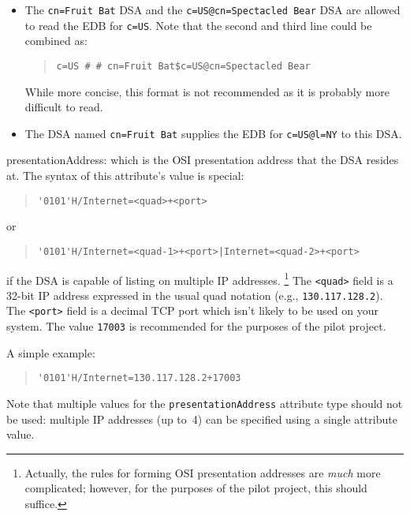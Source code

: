 \begin{describe}
\begin{itemize}
\item	The \verb"cn=Fruit Bat" DSA and the \verb"c=US@cn=Spectacled Bear" DSA
	are allowed to read the EDB for \verb"c=US". 
	Note that the second and third line could be combined as:
\begin{quote}\small\begin{verbatim}
c=US # # cn=Fruit Bat$c=US@cn=Spectacled Bear
\end{verbatim}\end{quote}
While more concise,
this format is not recommended as it is probably more difficult to read.

\item	The DSA named \verb"cn=Fruit Bat" supplies the EDB for \verb"c=US@l=NY"
	to this DSA.
\end{itemize}

\item[presentationAddress:]
			which is the OSI presentation address that the DSA
			resides at.
			The syntax of this attribute's value is special:
\begin{quote}\small\begin{verbatim}
'0101'H/Internet=<quad>+<port>
\end{verbatim}\end{quote}
or
\begin{quote}\small\begin{verbatim}
'0101'H/Internet=<quad-1>+<port>|Internet=<quad-2>+<port>
\end{verbatim}\end{quote}
if the DSA is capable of listing on multiple IP addresses.%
\footnote{Actually, the rules for forming OSI presentation addresses are
{\em much\/} more complicated;
however, for the purposes of the pilot project,
this should suffice.}
The \verb"<quad>" field is a 32-bit IP address expressed in the
usual quad notation (e.g., \verb"130.117.128.2").
The \verb"<port>" field is a decimal TCP port which isn't likely to
be used on your system.
The value \verb"17003" is recommended for the purposes of the pilot project.

A simple example:
\begin{quote}\small\begin{verbatim}
'0101'H/Internet=130.117.128.2+17003
\end{verbatim}\end{quote}
Note that multiple values for the \verb"presentationAddress" attribute type
should not be used:
multiple IP addresses (up to~4) can be specified using a single attribute value.


\end{describe}
